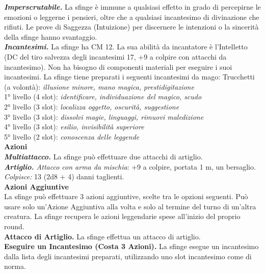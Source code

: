 \begin{multicols}{2}
\emph{\textbf{Imperscrutabile.}} La sfinge è immune a qualsiasi effetto in grado di percepirne le emozioni o leggerne i pensieri, oltre che a qualsiasi incantesimo di divinazione che rifiuti. Le prove di Saggezza (Intuizione) per discernere le intenzioni o la sincerità della sfinge
hanno svantaggio.\\

\emph{\textbf{Incantesimi.}} La sfinge ha CM 12. La sua abilità da incantatore è l'Intelletto (DC del tiro salvezza degli incantesimi 17, +9 a colpire con attacchi da incantesimo). Non ha bisogno di componenti materiali per eseguire i suoi incantesimi. La sfinge tiene preparati i seguenti incantesimi da mago: Trucchetti (a volontà): \emph{illusione minore, mano magica,} \emph{prestidigitazione}\\
1° livello (4 slot): \emph{identificare, individuazione del magico, scudo}\\
2° livello (3 slot): \emph{localizza oggetto, oscurità, suggestione}\\
3° livello (3 slot): \emph{dissolvi magie, linguaggi, rimuovi maledizione}\\
4° livello (3 slot): \emph{esilio, invisibilità superiore}\\
5° livello (2 slot): \emph{conoscenza delle leggende}\\
\smallskip\textbf{Azioni}\\
\emph{\textbf{Multiattacco.}} La sfinge può effettuare due attacchi di artiglio.\\
\emph{\textbf{Artiglio.} Attacco con arma da mischia}: +9 a colpire, portata 1 m, un bersaglio.\\
\emph{Colpisce:} 13 (2d8 + 4) danni taglienti.\\
\textbf{Azioni Aggiuntive}\\
La sfinge può effettuare 3 azioni aggiuntive, scelte tra le opzioni seguenti. Può usare solo un'Azione Aggiuntiva alla volta e solo al termine del turno di un'altra creatura. La sfinge recupera le azioni leggendarie spese all'inizio del proprio round. \\
\textbf{Attacco di Artiglio.} La sfinge effettua un attacco di artiglio.\\
\textbf{Eseguire un Incantesimo (Costa 3 Azioni).} La sfinge esegue un incantesimo dalla lista degli incantesimi preparati, utilizzando uno slot incantesimo come di norma.\\


\end{multicols}
